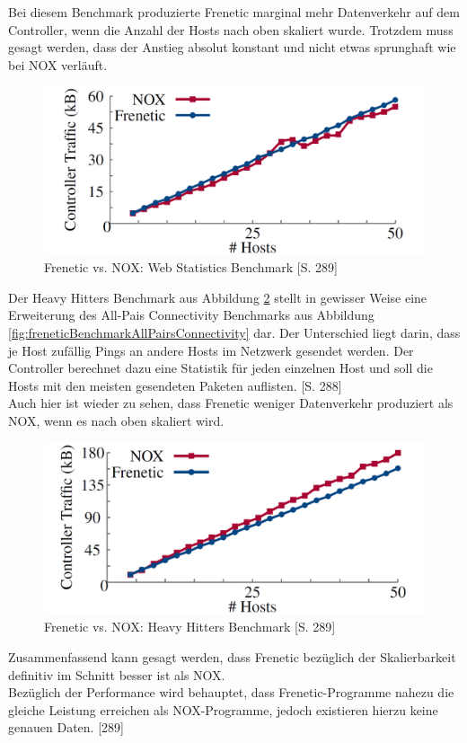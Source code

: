 \documentclass[10pt,conference]{IEEEtran}
\begin{document}
Bei diesem Benchmark produzierte Frenetic marginal mehr Datenverkehr auf dem Controller, wenn die Anzahl der Hosts nach oben skaliert wurde. Trotzdem muss gesagt werden, dass der Anstieg absolut konstant und nicht etwas sprunghaft wie bei NOX verläuft.
\begin{figure}[h]
	\centering
	\includegraphics[width=\columnwidth]{images/freneticBenchmarkWebStatistics.PNG}
	\caption{Frenetic vs. NOX: Web Statistics Benchmark \cite{4}[S. 289]}
	\label{fig:freneticBenchmarkWebStatistics}
\end{figure}
\newline
Der Heavy Hitters Benchmark aus Abbildung \ref{fig:freneticBenchmarkHeavyHitters} stellt in gewisser Weise eine Erweiterung des All-Pais Connectivity Benchmarks aus Abbildung \ref{fig:freneticBenchmarkAllPairsConnectivity} dar. Der Unterschied liegt darin, dass je Host zufällig Pings an andere Hosts im Netzwerk gesendet werden. Der Controller berechnet dazu eine Statistik für jeden einzelnen Host und soll die Hosts mit den meisten gesendeten Paketen auflisten. \cite{4}[S. 288]\\
Auch hier ist wieder zu sehen, dass Frenetic weniger Datenverkehr produziert als NOX, wenn es nach oben skaliert wird.
\begin{figure}[h]
	\centering
	\includegraphics[width=\columnwidth]{images/freneticBenchmarkHeavyHitters.PNG}
	\caption{Frenetic vs. NOX: Heavy Hitters Benchmark \cite{4}[S. 289]}
	\label{fig:freneticBenchmarkHeavyHitters}
\end{figure}
\newline
Zusammenfassend kann gesagt werden, dass Frenetic bezüglich der Skalierbarkeit definitiv im Schnitt besser ist als NOX.\\
Bezüglich der Performance wird behauptet, dass Frenetic-Programme nahezu die gleiche Leistung erreichen als NOX-Programme, jedoch existieren hierzu keine genauen Daten. \cite{4}[289]
\end{document}
